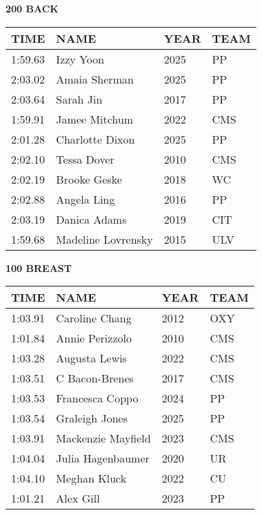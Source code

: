 \vspace{0.4cm}

\begin{minipage}[t]{0.48\textwidth}
\centering
\textbf{200 BACK}\\[0.05cm]
\begin{tabular}{@{}p{1.8cm}p{2.8cm}p{1.2cm}p{1.4cm}@{}}
\hline
\textbf{TIME} & \textbf{NAME} & \textbf{YEAR} & \textbf{TEAM} \\
\hline
1:59.63 & Izzy Yoon & 2025 & PP \\
2:03.02 & Amaia Sherman & 2025 & PP \\
2:03.64 & Sarah Jin & 2017 & PP \\
1:59.91 & Jamee Mitchum & 2022 & CMS \\
2:01.28 & Charlotte Dixon & 2025 & PP \\
2:02.10 & Tessa Dover & 2010 & CMS \\
2:02.19 & Brooke Geske & 2018 & WC \\
2:02.88 & Angela Ling & 2016 & PP \\
2:03.19 & Danica Adams & 2019 & CIT \\
1:59.68 & Madeline Lovrensky & 2015 & ULV \\
\hline
\end{tabular}
\end{minipage}\hfill
\begin{minipage}[t]{0.48\textwidth}
\centering
\textbf{100 BREAST}\\[0.05cm]
\begin{tabular}{@{}p{1.8cm}p{2.8cm}p{1.2cm}p{1.4cm}@{}}
\hline
\textbf{TIME} & \textbf{NAME} & \textbf{YEAR} & \textbf{TEAM} \\
\hline
1:03.91 & Caroline Chang & 2012 & OXY \\
1:01.84 & Annie Perizzolo & 2010 & CMS \\
1:03.28 & Augusta Lewis & 2022 & CMS \\
1:03.51 & C Bacon-Brenes & 2017 & CMS \\
1:03.53 & Francesca Coppo & 2024 & PP \\
1:03.54 & Graleigh Jones & 2025 & PP \\
1:03.91 & Mackenzie Mayfield & 2023 & CMS \\
1:04.04 & Julia Hagenbaumer & 2020 & UR \\
1:04.10 & Meghan Kluck & 2022 & CU \\
1:01.21 & Alex Gill & 2023 & PP \\
\hline
\end{tabular}
\end{minipage}

